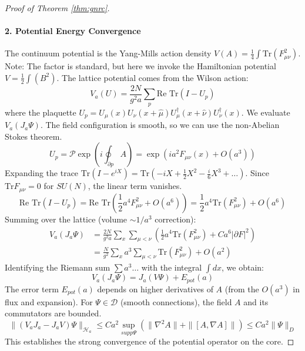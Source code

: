 \begin{proof}[Proof of Theorem \ref{thm:gnrc}]
\paragraph{2. Potential Energy Convergence}
The continuum potential is the Yang-Mills action density $V(A) = \frac{1}{4} \int \text{Tr}(F_{\mu\nu}^2)$. Note: The factor is standard, but here we invoke the Hamiltonian potential $V = \frac{1}{2} \int (B^2)$.
The lattice potential comes from the Wilson action:
\begin{equation}
V_a(U) = \frac{2N}{g^2 a} \sum_p \text{Re Tr}(I - U_p)
\end{equation}
where the plaquette $U_p = U_\mu(x) U_\nu(x+\hat{\mu}) U_\mu^\dagger(x+\hat{\nu}) U_\nu^\dagger(x)$.
We evaluate $V_a(J_a \Psi)$. The field configuration is smooth, so we can use the non-Abelian Stokes theorem.
\begin{equation}
U_p = \mathcal{P} \exp\left( i \oint_{\partial p} A \right) = \exp\left( i a^2 F_{\mu\nu}(x) + O(a^3) \right)
\end{equation}
Expanding the trace $\text{Tr}(I - e^{iX}) = \text{Tr}( -iX + \frac{1}{2} X^2 - \frac{i}{6} X^3 + \dots)$.
Since $\text{Tr} F_{\mu\nu} = 0$ for $SU(N)$, the linear term vanishes.
\begin{equation}
\text{Re Tr}(I - U_p) = \text{Re Tr}\left( \frac{1}{2} a^4 F_{\mu\nu}^2 + O(a^6) \right) = \frac{1}{2} a^4 \text{Tr}(F_{\mu\nu}^2) + O(a^6)
\end{equation}
Summing over the lattice (volume $\sim 1/a^3$ correction):
\begin{align}
V_a(J_a \Psi) &= \frac{2N}{g^2 a} \sum_x \sum_{\mu<\nu} \left( \frac{1}{2} a^4 \text{Tr}(F_{\mu\nu}^2) + C a^6 |\partial F|^2 \right) \\
&= \frac{N}{g^2} \sum_x a^3 \sum_{\mu<\nu} \text{Tr}(F_{\mu\nu}^2) + O(a^2)
\end{align}
Identifying the Riemann sum $\sum a^3 \dots$ with the integral $\int dx$, we obtain:
\begin{equation}
V_a(J_a \Psi) = J_a (V \Psi) + E_{pot}(a)
\end{equation}
The error term $E_{pot}(a)$ depends on higher derivatives of $A$ (from the $O(a^3)$ in flux and expansion).
For $\Psi \in \mathcal{D}$ (smooth connections), the field $A$ and its commutators are bounded.
\begin{equation}
\| (V_a J_a - J_a V) \Psi \|_{\mathcal{H}_a} \le C a^2 \sup_{supp \Psi} (\| \nabla^2 A \| + \| [A, \nabla A] \| ) \le C a^2 \| \Psi \|_D
\end{equation}
This establishes the strong convergence of the potential operator on the core.


\end{proof}

